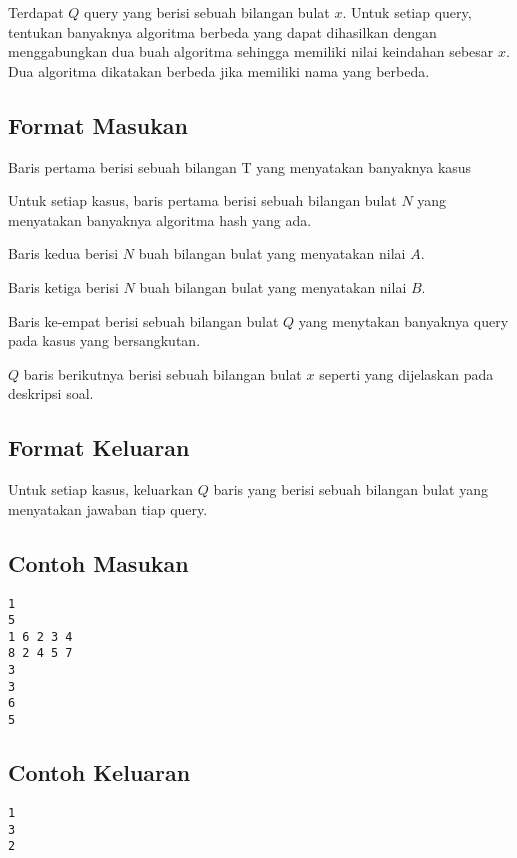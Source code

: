 \documentclass{article}
\begin{document}
\par Terdapat $Q$ query yang berisi sebuah bilangan bulat $x$. Untuk setiap query, tentukan banyaknya algoritma berbeda yang dapat dihasilkan dengan menggabungkan dua buah algoritma sehingga memiliki nilai keindahan sebesar $x$. Dua algoritma dikatakan berbeda jika memiliki nama yang berbeda.

\subsection*{Format Masukan}
\par Baris pertama berisi sebuah bilangan T yang menyatakan banyaknya kasus
\par Untuk setiap kasus, baris pertama berisi sebuah bilangan bulat $N$ yang menyatakan banyaknya algoritma hash yang ada.
\par Baris kedua berisi $N$ buah bilangan bulat yang menyatakan nilai $A$.
\par Baris ketiga berisi $N$ buah bilangan bulat yang menyatakan nilai $B$.
\par Baris ke-empat berisi sebuah bilangan bulat $Q$ yang menytakan banyaknya query pada kasus yang bersangkutan.
\par $Q$ baris berikutnya berisi sebuah bilangan bulat $x$ seperti yang dijelaskan pada deskripsi soal.

\subsection*{Format Keluaran}

\par Untuk setiap kasus, keluarkan $Q$ baris yang berisi sebuah bilangan bulat yang menyatakan jawaban tiap query.

\subsection*{Contoh Masukan}

\begin{lstlisting}
1
5
1 6 2 3 4
8 2 4 5 7
3
3
6
5
\end{lstlisting}

\subsection*{Contoh Keluaran}

\begin{lstlisting}
1
3
2
\end{lstlisting}
\end{document}
